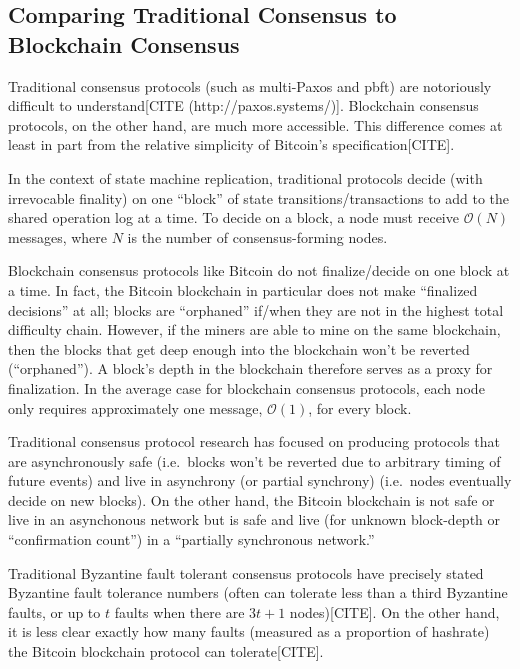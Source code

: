 \documentclass{article}
\theoremstyle{definition}
\begin{document}
\subsection{Comparing Traditional Consensus to Blockchain Consensus}

Traditional consensus protocols (such as multi-Paxos and pbft) are notoriously difficult to understand[CITE (http://paxos.systems/)]. Blockchain consensus protocols, on the other hand, are much more accessible. This difference comes at least in part from the relative simplicity of Bitcoin's specification[CITE].

In the context of state machine replication, traditional protocols decide (with irrevocable finality) on one ``block'' of state transitions/transactions to add to the shared operation log at a time. To decide on a block, a node must receive $\mathcal{O}(N)$ messages, where $N$ is the number of consensus-forming nodes.

Blockchain consensus protocols like Bitcoin do not finalize/decide on one block at a time. In fact, the Bitcoin blockchain in particular does not make ``finalized decisions'' at all; blocks are ``orphaned'' if/when they are not in the highest total difficulty chain. However, if the miners are able to mine on the same blockchain, then the blocks that get deep enough into the blockchain won't be reverted (``orphaned''). A block's depth in the blockchain therefore serves as a proxy for finalization. In the average case for blockchain consensus protocols, each node only requires approximately one message, $\mathcal{O}(1)$, for every block.

Traditional consensus protocol research has focused on producing protocols that are asynchronously safe (i.e.\ blocks won't be reverted due to arbitrary timing of future events) and live in asynchrony (or partial synchrony) (i.e.\ nodes eventually decide on new blocks). On the other hand, the Bitcoin blockchain is not safe or live in an asynchonous network but is safe and live (for unknown block-depth or ``confirmation count'') in a ``partially synchronous network.''

Traditional Byzantine fault tolerant consensus protocols have precisely stated Byzantine fault tolerance numbers (often can tolerate less than a third Byzantine faults, or up to $t$ faults when there are $3t + 1$ nodes)[CITE]. On the other hand, it is less clear exactly how many faults (measured as a proportion of hashrate) the Bitcoin blockchain protocol can tolerate[CITE].
\end{document}
